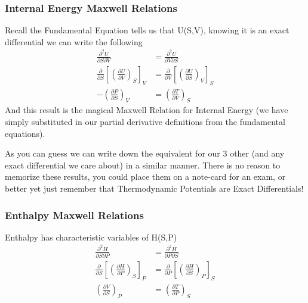 \documentclass{article}
\begin{document}
\subsubsection*{Internal Energy Maxwell Relations}
Recall the Fundamental Equation tells us that U(S,V), knowing it is an exact differential we can write the following
\begin{equation}
\begin{split}
\frac{\partial ^2 U}{\partial S \partial V} &= \frac{\partial ^2 U}{\partial V \partial S} \\
\frac{\partial }{\partial S}\left[\left(\frac{\partial U}{\partial V}\right)_S\right]_V &= \frac{\partial}{\partial V}\left[\left(\frac{\partial U }{\partial S}\right)_V\right]_S \\
-\left(\frac{\partial P}{\partial S}\right)_V &= \left(\frac{\partial T}{\partial V}\right)_S
\end{split}
\end{equation}
And this result is the magical Maxwell Relation for Internal Energy (we have simply substituted in our partial derivative definitions from the fundamental equations). 

As you can guess we can write down the equivalent for our 3 other (and any exact differential we care about) in a similar manner. 
There is no reason to memorize these results, you could place them on a note-card for an exam, or better yet just remember that Thermodynamic Potentials are Exact Differentials!

\subsubsection*{Enthalpy Maxwell Relations}
Enthalpy has characteristic variables of H(S,P)
\begin{equation}
\begin{split}
\frac{\partial ^2 H}{\partial S \partial P} &= \frac{\partial ^2 H}{\partial P \partial S} \\
\frac{\partial }{\partial S}\left[\left(\frac{\partial H}{\partial P}\right)_S\right]_P &= \frac{\partial}{\partial P}\left[\left(\frac{\partial H }{\partial S}\right)_P\right]_S \\
 \left(\frac{\partial V}{\partial S}\right)_P &=
\left(\frac{\partial T}{\partial P}\right)_S
\end{split}
\end{equation}
\end{document}
